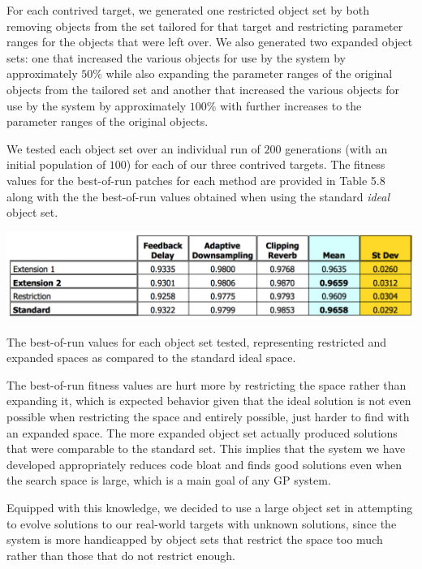\documentclass[12pt]{report} 	%
\numberwithin{figure}{chapter}
\numberwithin{table}{chapter}
\numberwithin{equation}{chapter}
\begin{document}
\begin{flushleft}
For each contrived target, we generated one restricted object set by both removing objects from the set tailored for that target and restricting parameter ranges for the objects that were left over. We also generated two expanded object sets: one that increased the various objects for use by the system by approximately $50\%$ while also expanding the parameter ranges of the original objects from the tailored set and another that increased the various objects for use by the system by approximately $100\%$ with further increases to the parameter ranges of the original objects.

We tested each object set over an individual run of $200$ generations (with an initial population of $100$) for each of our three contrived targets. The fitness values for the best-of-run patches for each method are provided in Table 5.8 along with the the best-of-run values obtained when using the standard \textit{ideal} object set.

\begin{table}[h!]
\begin{center}
\includegraphics[scale=0.6,width=\linewidth]{ExpansionRestrictionTable}
\caption[Restriction/expansion best-of-run values]{The best-of-run values for each object set tested, representing restricted and expanded spaces as compared to the standard ideal space.}
\end{center}
\end{table}

The best-of-run fitness values are hurt more by restricting the space rather than expanding it, which is expected behavior given that the ideal solution is not even possible when restricting the space and entirely possible, just harder to find with an expanded space. The more expanded object set actually produced solutions that were comparable to the standard set. This implies that the system we have developed appropriately reduces code bloat and finds good solutions even when the search space is large, which is a main goal of any GP system. 

Equipped with this knowledge, we decided to use a large object set in attempting to evolve solutions to our real-world targets with unknown solutions, since the system is more handicapped by object sets that restrict the space too much rather than those that do not restrict enough.


\end{flushleft}
\end{document}
